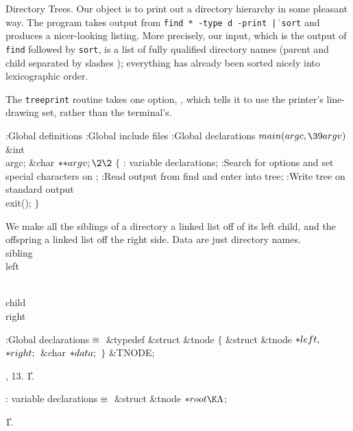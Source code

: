 
\def\covernote{Copyright 1987 Norman Ramsey -- Princeton University}

\def\vbar{\.{|}}

Directory Trees.
Our object is to print out a directory hierarchy in some pleasant way.
The program takes output from {\tt find * -type d -print \vbar\ sort}
and produces a nicer-looking listing.
More precisely, our input, which is the output of {\tt find} followed
by {\tt sort}, is a list of fully qualified directory names (parent
and child separated by slashes ); everything has already been
sorted nicely into lexicographic order.

The {\tt treeprint} routine takes one option, , which tells it
to use the printer's line-drawing set, rather than the terminal's.

\Y\B{}:Global definitions\X\6
:Global include files\X\6
:Global declarations\X\7
${}\\{main}(\\{argc},\39\\{argv}){}$\1\1\6
\&{int} \\{argc};\6
\&{char} ${}{*}{*}\\{argv};\2\2{}$\6
${}\{{}$\1\6
: variable declarations\X;\6
:Search for options and set special characters on \X;\6
:Read output from find and enter into tree\X;\6
:Write tree on standard output\X\6
\\{exit}();\6
\4${}\}{}$\2\par
\fi

We make all the siblings of a directory a linked list off of its left child,
and the offspring a linked list off the right side.
Data are just directory names.
\Y\B\4\D\\{sibling}\5
\\{left}\par
\B\4\D\\{child}\5
\\{right}\par
\Y\B\4:Global declarations\X${}\equiv{}$\6
\&{typedef} \&{struct} \&{tnode} ${}\{{}$\1\6
\&{struct} \&{tnode} ${}{*}\\{left},{}$ ${}{*}\\{right};{}$\6
\&{char} ${}{*}\\{data};{}$\2\6
${}\}{}$ \&{TNODE};\par
{}, 13.
\U1.\fi

\B{}: variable declarations\X${}\equiv{}$\6
\&{struct} \&{tnode} ${}{*}\\{root}\K\NULL{}$;\par
\U1.\fi

